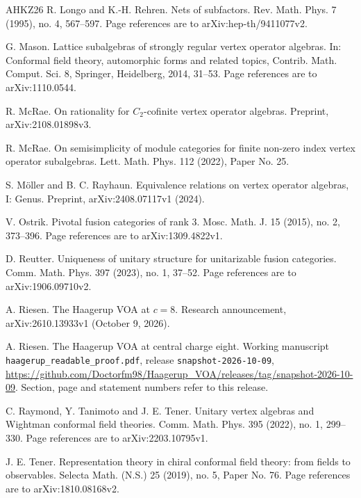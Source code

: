 \documentclass[leqno]{article}
\numberwithin{equation}{section}
\begin{document}
\begin{thebibliography}{AHKZ26}
R. Longo and K.-H. Rehren.
\newblock Nets of subfactors.
\newblock Rev. Math. Phys. 7 (1995), no. 4, 567--597. Page references are to arXiv:hep-th/9411077v2.

G. Mason.
\newblock Lattice subalgebras of strongly regular vertex operator algebras.
\newblock In: Conformal field theory, automorphic forms and related topics, Contrib. Math. Comput. Sci. 8, Springer, Heidelberg, 2014, 31--53. Page references are to arXiv:1110.0544.

R. McRae.
\newblock On rationality for $C_2$-cofinite vertex operator algebras.
\newblock Preprint, arXiv:2108.01898v3.

R. McRae.
\newblock On semisimplicity of module categories for finite non-zero index vertex operator subalgebras.
\newblock Lett. Math. Phys. 112 (2022), Paper No. 25.

S. Möller and B. C. Rayhaun.
\newblock Equivalence relations on vertex operator algebras, I: Genus.
\newblock Preprint, arXiv:2408.07117v1 (2024).

V. Ostrik.
\newblock Pivotal fusion categories of rank 3.
\newblock Mosc. Math. J. 15 (2015), no. 2, 373--396. Page references are to arXiv:1309.4822v1.

D. Reutter.
\newblock Uniqueness of unitary structure for unitarizable fusion categories.
\newblock Comm. Math. Phys. 397 (2023), no. 1, 37--52. Page references are to arXiv:1906.09710v2.

A. Riesen.
\newblock The Haagerup VOA at $c = 8$.
\newblock Research announcement, arXiv:2610.13933v1 (October 9, 2026).

A. Riesen.
\newblock The Haagerup VOA at central charge eight.
\newblock Working manuscript \texttt{haagerup\_readable\_proof.pdf}, release \texttt{snapshot-2026-10-09}, \url{https://github.com/Doctorfm98/Haagerup_VOA/releases/tag/snapshot-2026-10-09}. Section, page and statement numbers refer to this release.

C. Raymond, Y. Tanimoto and J. E. Tener.
\newblock Unitary vertex algebras and Wightman conformal field theories.
\newblock Comm. Math. Phys. 395 (2022), no. 1, 299--330. Page references are to arXiv:2203.10795v1.

J. E. Tener.
\newblock Representation theory in chiral conformal field theory: from fields to observables.
\newblock Selecta Math. (N.S.) 25 (2019), no. 5, Paper No. 76. Page references are to arXiv:1810.08168v2.


\end{thebibliography}
\end{document}
